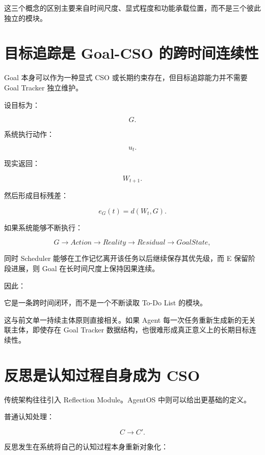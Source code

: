 这三个概念的区别主要来自时间尺度、显式程度和功能承载位置，而不是三个彼此独立的模块。

\section{目标追踪是 Goal-CSO 的跨时间连续性}

Goal 本身可以作为一种显式 CSO 或长期约束存在，但目标追踪能力并不需要 Goal Tracker 独立维护。

设目标为：

\[
G.
\]

系统执行动作：

\[
u_t.
\]

现实返回：

\[
W_{t+1}.
\]

然后形成目标残差：

\[
e_G(t)
=
d(
W_t,
G
).
\]

如果系统能够不断执行：

\[
G
\rightarrow
Action
\rightarrow
Reality
\rightarrow
Residual
\rightarrow
GoalState,
\]

同时 Scheduler 能够在工作记忆离开该任务以后继续保存其优先级，而 E 保留阶段进展，则 Goal 在长时间尺度上保持因果连续。

因此：

\begin{statementbox}
\centering
{}
\end{statementbox}

它是一条跨时间闭环，而不是一个不断读取 To-Do List 的模块。

这与前文单一持续主体原则直接相关。如果 Agent 每一次任务重新生成新的无关联主体，即使存在 Goal Tracker 数据结构，也很难形成真正意义上的长期目标连续性。

\section{反思是认知过程自身成为 CSO}

传统架构往往引入 Reflection Module。AgentOS 中则可以给出更基础的定义。

普通认知处理：

\[
C
\rightarrow
C'.
\]

反思发生在系统将自己的认知过程本身重新对象化：

\begin{statementbox}
\centering
{}
\end{statementbox}

